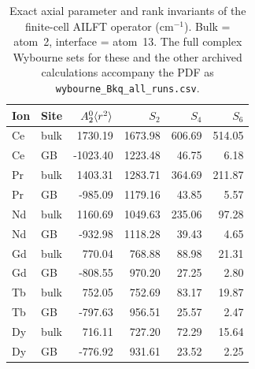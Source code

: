 \begin{table}[H]
\centering
\footnotesize
\setlength{\tabcolsep}{4pt}
\caption{Exact axial parameter and rank invariants of the finite-cell AILFT operator (cm$^{-1}$). Bulk = atom~2, interface = atom~13. The full complex Wybourne sets for these and the other archived calculations accompany the PDF as \texttt{wybourne\_Bkq\_all\_runs.csv}.}\label{tab:S5}
\begin{tabular}{llrrrr}
\toprule
Ion & Site & $A_2^0\langle r^2\rangle$ & $S_2$ & $S_4$ & $S_6$ \\
\midrule
Ce & bulk & 1730.19 & 1673.98 & 606.69 & 514.05 \\
Ce & GB & -1023.40 & 1223.48 & 46.75 & 6.18 \\
Pr & bulk & 1403.31 & 1283.71 & 364.69 & 211.87 \\
Pr & GB & -985.09 & 1179.16 & 43.85 & 5.57 \\
Nd & bulk & 1160.69 & 1049.63 & 235.06 & 97.28 \\
Nd & GB & -932.98 & 1118.28 & 39.43 & 4.65 \\
Gd & bulk & 770.04 & 768.88 & 88.98 & 21.31 \\
Gd & GB & -808.55 & 970.20 & 27.25 & 2.80 \\
Tb & bulk & 752.05 & 752.69 & 83.17 & 19.87 \\
Tb & GB & -797.63 & 956.51 & 25.57 & 2.47 \\
Dy & bulk & 716.11 & 727.20 & 72.29 & 15.64 \\
Dy & GB & -776.92 & 931.61 & 23.52 & 2.25 \\
\bottomrule
\end{tabular}
\end{table}

